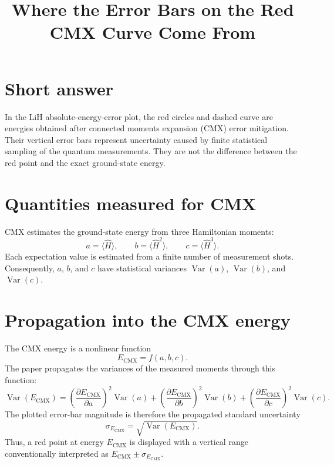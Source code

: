 \documentclass[11pt]{article}
\title{Where the Error Bars on the Red CMX Curve Come From}
\author{}
\date{}
\begin{document}
\maketitle

\section*{Short answer}

In the LiH absolute-energy-error plot, the \textcolor{cmxred}{red circles and
dashed curve} are energies obtained after connected moments expansion (CMX)
error mitigation.  Their vertical error bars represent uncertainty caused by
finite statistical sampling of the quantum measurements.  They are not the
difference between the red point and the exact ground-state energy.

\section*{Quantities measured for CMX}

CMX estimates the ground-state energy from three Hamiltonian moments:
\begin{equation}
  a=\langle \hat H\rangle,\qquad
  b=\langle \hat H^2\rangle,\qquad
  c=\langle \hat H^3\rangle .
\end{equation}
Each expectation value is estimated from a finite number of measurement shots.
Consequently, $a$, $b$, and $c$ have statistical variances
$\operatorname{Var}(a)$, $\operatorname{Var}(b)$, and
$\operatorname{Var}(c)$.

\section*{Propagation into the CMX energy}

The CMX energy is a nonlinear function
\begin{equation}
  E_{\mathrm{CMX}}=f(a,b,c).
\end{equation}
The paper propagates the variances of the measured moments through this
function:
\begin{equation}
\label{eq:propagation}
  \operatorname{Var}(E_{\mathrm{CMX}})
  =
  \left(\frac{\partial E_{\mathrm{CMX}}}{\partial a}\right)^2
       \operatorname{Var}(a)
  +
  \left(\frac{\partial E_{\mathrm{CMX}}}{\partial b}\right)^2
       \operatorname{Var}(b)
  +
  \left(\frac{\partial E_{\mathrm{CMX}}}{\partial c}\right)^2
       \operatorname{Var}(c).
\end{equation}
The plotted error-bar magnitude is therefore the propagated standard
uncertainty
\begin{equation}
  \boxed{\sigma_{E_{\mathrm{CMX}}}
  =\sqrt{\operatorname{Var}(E_{\mathrm{CMX}})}}.
\end{equation}
Thus, a red point at energy $E_{\mathrm{CMX}}$ is displayed with a vertical
range conventionally interpreted as
$E_{\mathrm{CMX}}\pm\sigma_{E_{\mathrm{CMX}}}$.
\end{document}
